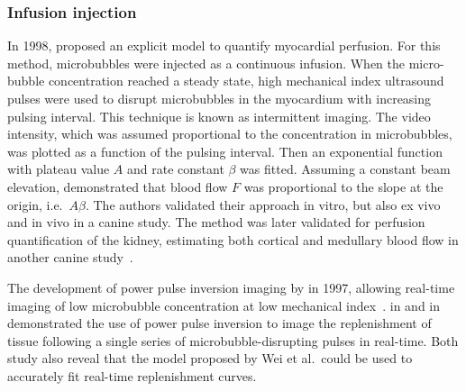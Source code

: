 \subsubsection{Infusion injection}
In 1998, \citet{Wei:1998jd} proposed an explicit model to quantify myocardial perfusion. %
For this method, microbubbles were injected as a continuous infusion.
When the micro-bubble concentration reached a steady state, high mechanical index ultrasound pulses were used to disrupt microbubbles in the myocardium with increasing pulsing interval.
This technique is known as intermittent imaging.
The video intensity, which was assumed proportional to the concentration in microbubbles, was plotted as a function of the pulsing interval. 
Then an exponential function with plateau value $A$ and rate constant $\beta$ was fitted. 
Assuming a constant beam elevation, \citet{Wei:1998jd} demonstrated that blood flow $F$ was proportional to the slope at the origin, i.e.~$A\beta$.
The authors validated their approach in vitro, but also ex vivo and in vivo in a canine study.
The method was later validated for perfusion quantification of the kidney, estimating both cortical and medullary blood flow in another canine study~\cite{Wei:2001id}. %

The development of power pulse inversion imaging by \citet{Simpson:1997jn} in 1997, %
allowing real-time imaging of low microbubble concentration at low mechanical index~\cite{Tiemann:1999vy}. %
\citet{Tiemann:2000wn} in \citeyear{Tiemann:2000wn} %
and \citet{Masugata:2001vg} in \citeyear{Masugata:2001vg} %
demonstrated the use of power pulse inversion to image the replenishment of tissue following a single series of microbubble-disrupting pulses in real-time.
Both study also reveal that the model proposed by Wei et al.~could be used to accurately fit real-time replenishment curves.

